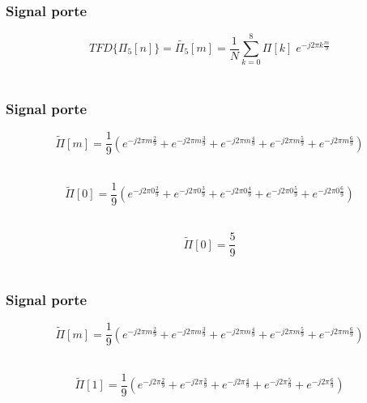 \documentclass{beamer}
\begin{document}
\begin{frame}
\frametitle{Signal porte} 
\[ TFD\{ \Pi_5[n] \} = \tilde{\Pi_5}[m]  = \frac{1}{N} \sum_{k = 0}^{8} \Pi[k] \; e^{-j 2 \pi k \frac{m}{9}}  \]\\
\end{frame}
 
\begin{frame}
\frametitle{Signal porte} 
\[  \tilde{\Pi}[m]  =    \frac{1}{9} ( e^{-j 2 \pi  m \frac{2}{9}} +  e^{-j 2 \pi  m \frac{3}{9}} +  e^{-j 2 \pi  m \frac{4}{9}} +  e^{-j 2 \pi  m \frac{5}{9}} + e^{-j 2 \pi  m \frac{6}{9}} ) \]\\
\vspace{0.3cm}

\[  \tilde{\Pi}[0]  =   \frac{1}{9} (  e^{-j 2 \pi  0 \frac{2}{9}} +  e^{-j 2 \pi  0 \frac{3}{9}} +  e^{-j 2 \pi  0 \frac{4}{9}} +  e^{-j 2 \pi  0 \frac{5}{9}} + e^{-j 2 \pi  0 \frac{6}{9}} ) \]\\
\vspace{0.3cm}

\[ \boxed{ \tilde{\Pi}[0]  =   \frac{5}{9} }\]\\
\vspace{0.3cm}

\end{frame}

\begin{frame}
\frametitle{Signal porte} 
\[  \tilde{\Pi}[m]  =    \frac{1}{9} ( e^{-j 2 \pi  m \frac{2}{9}} +  e^{-j 2 \pi  m \frac{3}{9}} +  e^{-j 2 \pi  m \frac{4}{9}} +  e^{-j 2 \pi  m \frac{5}{9}} + e^{-j 2 \pi  m \frac{6}{9}} ) \]\\
\vspace{0.3cm}

\[  \tilde{\Pi}[1]  =   \frac{1}{9} (  e^{-j 2 \pi   \frac{2}{9}} +  e^{-j 2 \pi   \frac{3}{9}} +  e^{-j 2 \pi   \frac{4}{9}} +  e^{-j 2 \pi   \frac{5}{9}} + e^{-j 2 \pi   \frac{6}{9}} ) \]\\
\vspace{0.3cm}


\end{frame}
\end{document}
